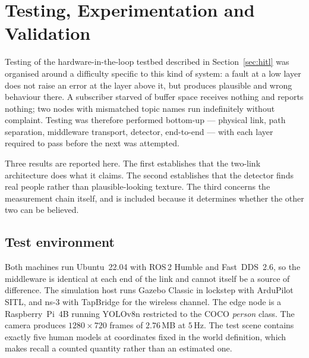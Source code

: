 %      
%
%
%

\section{Testing, Experimentation and Validation}
\label{sec:test}

Testing of the hardware-in-the-loop testbed described in
Section~\ref{sec:hitl} was organised around a difficulty specific to this
kind of system: a fault at a low layer does not raise an error at the layer
above it, but produces plausible and wrong behaviour there. A subscriber
starved of buffer space receives nothing and reports nothing; two nodes with
mismatched topic names run indefinitely without complaint. Testing was
therefore performed bottom-up --- physical link, path separation, middleware
transport, detector, end-to-end --- with each layer required to pass before
the next was attempted.

Three results are reported here. The first establishes that the two-link
architecture does what it claims. The second establishes that the detector
finds real people rather than plausible-looking texture. The third concerns
the measurement chain itself, and is included because it determines whether
the other two can be believed.

\subsection{Test environment}
\label{sec:test-env}

Both machines run Ubuntu~22.04 with ROS\,2 Humble and Fast~DDS~2.6, so the
middleware is identical at each end of the link and cannot itself be a
source of difference. The simulation host runs Gazebo Classic in lockstep
with ArduPilot SITL, and ns-3 with TapBridge for the wireless channel. The
edge node is a Raspberry~Pi~4B running YOLOv8n restricted to the COCO
\emph{person} class. The camera produces $1280 \times 720$ frames of
$2.76$\,MB at $5$\,Hz. The test scene contains exactly five human models at
coordinates fixed in the world definition, which makes recall a counted
quantity rather than an estimated one.

